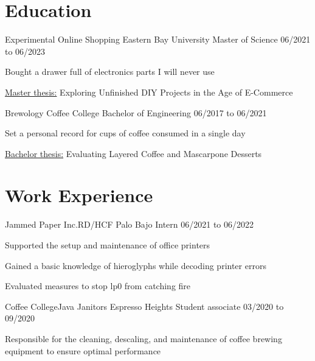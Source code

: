 %
%
%
%

\section{Education}
\begin{resumeList}  {Experimental Online Shopping}{}    {Eastern Bay University}
                    {Master of Science}                 {06/2021 to 06/2023}
    \item Bought a drawer full of electronics parts I will never use
    \item \underline{Master thesis:} Exploring Unfinished DIY Projects in the Age of E-Commerce
\end{resumeList}
\begin{resumeList}  {Brewology}{}                {Coffee College}
                    {Bachelor of Engineering}    {06/2017 to 06/2021}
    \item Set a personal record for cups of coffee consumed in a single day
    \item \underline{Bachelor thesis:} Evaluating Layered Coffee and Mascarpone Desserts
\end{resumeList}


\section{Work Experience}
\begin{resumeList}  {Jammed Paper Inc.}{RD/HCF}    {Palo Bajo}
                    {Intern}                       {06/2021 to 06/2022}
    \item Supported the setup and maintenance of office printers
    \item Gained a basic knowledge of hieroglyphs while decoding printer errors
    \item Evaluated measures to stop lp0 from catching fire
\end{resumeList}
\begin{resumeList}  {Coffee College}{Java Janitors}    {Espresso Heights}
                    {Student associate}                {03/2020 to 09/2020}
    \item Responsible for the cleaning, descaling, and maintenance of coffee brewing equipment to ensure optimal performance
\end{resumeList}


